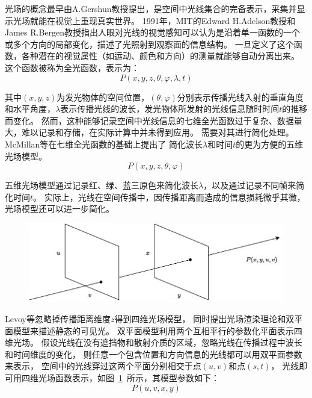 光场的概念最早由A.Gershun教授提出，是空间中光线集合的完备表示，采集并显示光场就能在视觉上重现真实世界。
1991年，MIT的Edward H.Adelson教授和James R.Bergen教授指出人眼对光线的视觉感知可以认为是沿着单一函数的一个或多个方向的局部变化，描述了光照射到观察面的信息结构。
一旦定义了这个函数，各种潜在的视觉属性（如运动、颜色和方向）的测量就能够自动分离出来。
这个函数被称为全光函数，表示为：
\begin{equation}
	P(x,y,z,\theta,\varphi,\lambda,t)
\end{equation}\par
其中$(x,y,z)$为发光物体的空间位置，$(\theta,\varphi)$分别表示传播光线入射的垂直角度和水平角度，$\lambda$表示传播光线的波长，发光物体所发射的光线信息随时时间$t$的推移而变化。
然而，这种能够记录空间中光线信息的七维全光函数过于复杂、数据量大，难以记录和存储，在实际计算中并未得到应用。
需要对其进行简化处理。
McMillan等在七维全光函数的基础上提出了
简化波长$\lambda$和时间$t$的更为方便的五维光场模型。
\begin{equation}
	P(x,y,z,\theta,\varphi)
\end{equation}\par
五维光场模型通过记录红、绿、蓝三原色来简化波长$\lambda$，以及通过记录不同帧来简化时间$t$。
实际上，光线在空间传播中，因传播距离而造成的信息损耗微乎其微，光场模型还可以进一步简化。
%
%
%
%
\begin{figure}[!ht]
	\centering
	\includegraphics[width=0.95\linewidth]{figures/chapter2/double_plane_model.drawio}
	\label{chapter2_fig1:double_plane}
\end{figure}
%
%
%
%
Levoy等忽略掉传播距离维度$z$得到四维光场模型，
同时提出光场渲染理论和双平面模型来描述静态的可见光。
双平面模型利用两个互相平行的参数化平面表示四维光场。
假设光线在没有遮挡物和散射介质的区域，忽略光线在传播过程中波长和时间维度的变化，
则任意一个包含位置和方向信息的光线都可以用双平面参数来表示，
空间中的光线穿过这两个平面分别相交于点$(u, v)$和点$(s, t)$，
光线即可用四维光场函数表示，如图~\ref{chapter2_fig1:double_plane}~所示，其模型参数如下：
\begin{equation}
	P(u, v, x, y)
\end{equation}




